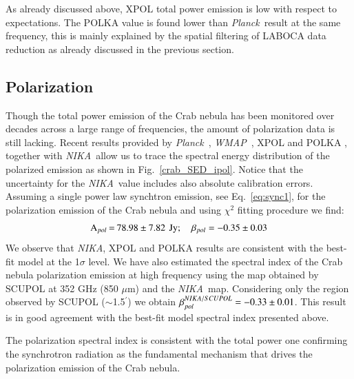 \documentclass[twocolumn,traditabstract]{aa}
\def\NIKA{\textit{NIKA}}
\def\Planck{\textit{Planck}}
\def\WMAP{\textit{WMAP}}
\begin{document}
As already discussed above, XPOL total power emission is low with respect to expectations.
The POLKA value is found lower than \Planck\ result at the same frequency, this is mainly explained by the spatial filtering of LABOCA data reduction as already discussed in the previous section.
  

\subsection{Polarization}
Though the total power emission of the Crab nebula has been monitored over decades across a large range of frequencies, the amount of polarization data is still lacking.
Recent results provided by
\Planck\ \citep{2015arXiv150702058P}, \WMAP\ \citep{2011ApJS..192...19W},
XPOL \citep{aumont2010} and POLKA \citep{2014PASP..126.1027W}, together with \NIKA\ allow us to trace the spectral energy distribution of the polarized emission as shown in Fig.~\ref{crab_SED_ipol}.  
Notice that the uncertainty for the \NIKA\ value includes also absolute calibration errors.  
Assuming a single power law synchtron emission, see Eq.~\ref{eq:sync1}, for the polarization emission of the Crab nebula and using $\chi^2$ fitting procedure we find:
$$
\setlength\arraycolsep{0.1em}
 \begin{array}{rclcl}
  \textrm{A$_{pol}$}&=& 78.98\pm7.82 & & \textrm{Jy}; \quad \textrm{$\beta_{pol}$} = - 0.35\pm0.03\\
 \end{array}
 $$
We observe that \NIKA, XPOL and POLKA results are consistent with the best-fit model at the 1$\sigma$ level.
We have also estimated the spectral index of the Crab nebula polarization
emission at high frequency using the map obtained by SCUPOL \citep{scubapol} at 352 GHz (850
$\mu$m) and the \NIKA\ map. Considering only the region observed by SCUPOL ($\sim$1.5$^{\prime}$) we
obtain $\beta_{pol}^{\small NIKA/SCUPOL} = -0.33 \pm 0.01$.
This result is in good agreement with the best-fit model spectral index presented above.

The polarization spectral index is consistent with the total power one confirming the synchrotron radiation as the fundamental mechanism that drives the polarization emission of the Crab nebula.
\end{document}
